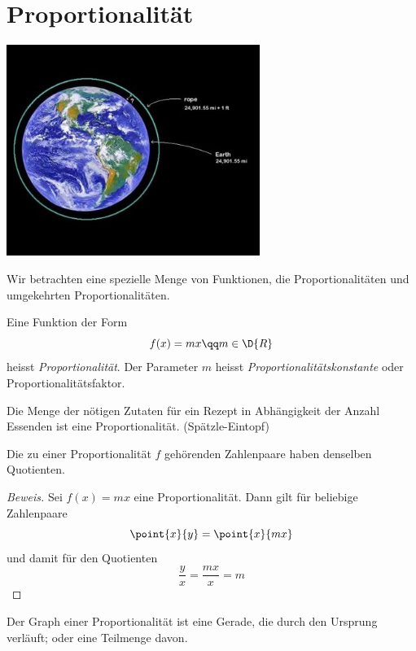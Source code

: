 \documentclass[%
11pt,%
twoside,%
titlepage,%
german,%
headsepline%
]{scrartcl}
\begin{document}
\section{Proportionalit\"at}
  \begin{center}
    \includegraphics[width=0.618\textwidth]{pictures/rope}
  \end{center}
Wir betrachten eine spezielle Menge von Funktionen, die Proportionalit\"aten und umgekehrten Proportionalit\"aten.
\begin{cdef}[Proportionalität]{}
Eine Funktion der Form
$$f(x)=mx\qq m\in\D{R}$$
heisst \emph{Proportionalit\"at}. Der Parameter $m$ heisst \emph{Proportionalit\"atskonstante} oder Proportionalit\"atsfaktor.
\end{cdef}
\begin{bsp}
Die Menge der n\"otigen Zutaten f\"ur ein Rezept in Abh\"angigkeit der Anzahl Essenden ist eine Proportionalit\"at. (Sp\"atzle-Eintopf)
\end{bsp}
\begin{csatz}{}
Die zu einer Proportionalit\"at $f$ geh\"orenden Zahlenpaare haben denselben Quo\-tien\-ten.
\end{csatz}
\begin{proof}[Beweis]
Sei $f(x)=mx$ eine Proportionalit\"at. Dann gilt f\"ur beliebige Zahlenpaare
$$\point{x}{y}=\point{x}{mx}$$
und damit f\"ur den Quotienten
$$\frac{y}{x}=\frac{mx}{x}=m$$
\end{proof}
\begin{csatz}{}
Der Graph einer Proportionalit\"at ist eine Gerade, die durch den Ursprung verl\"auft; oder eine Teilmenge davon.
\end{csatz}
\end{document}
